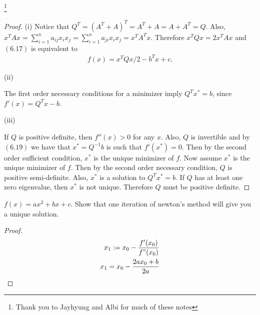 \documentclass[12pt]{article}
\newenvironment{problem}[2][Problem]{\begin{trivlist}
\item[\hskip \labelsep {\bfseries #1}\hskip \labelsep {\bfseries #2.}]}{\end{trivlist}}
\begin{document}
\begin{problem}{6.7}\footnote{Thank you to Jayhyung and Albi for much of these notes} ~\\
\begin{proof}
(i)
Notice that $Q^T = (A^T + A)^T = A^T+ A = A + A^T = Q$.
Also, $x^TAx = \sum_{i=1}^na_{ij}x_ix_j = \sum_{i=1}^na_{ji}x_ix_j = x^TA^Tx$.
Therefore $x^TQx = 2x^TAx$ and $(6.17)$ is equivalent to
\begin{align*}
    f(x) = x^TQx/2 - b^Tx +c.
\end{align*}

(ii)

The first order necessary conditions for a minimizer imply
$Q^Tx^* = b$, since $f'(x) = Q^Tx-b$.

(iii)

If $Q$ is positive definite, then $f''(x)>0$ for any $x$.
Also, $Q$ is invertible and by $(6.19)$ we have
that $x^*=Q^{-1}b$ is such that $f'(x^*)=0$.
Then by the second order sufficient condition, $x^*$ is the unique minimizer of $f$.
Now assume $x^*$ is the unique minimizer of $f$.
Then by the second order necessary condition, $Q$ is positive semi-definite.
Also, $x^*$ is a solution to $Q^Tx^*=b$.
If $Q$ has at least one zero eigenvalue, then $x^*$ is not unique.
Therefore $Q$ must be positive definite.
\end{proof}
\end{problem}


\begin{problem}{6.11}
$f(x) = ax^2 + bx + c$.
Show that one iteration of newton's method will give you a unique solution.

\begin{proof}
\begin{align*}
x_1:= x_0 - \frac{f'(x_0)}{f"(x_0)} \\
x_1 = x_0 - \frac{2ax_0+b}{2a} \\
\end{align*}
\end{proof}

\end{problem}
\end{document}
